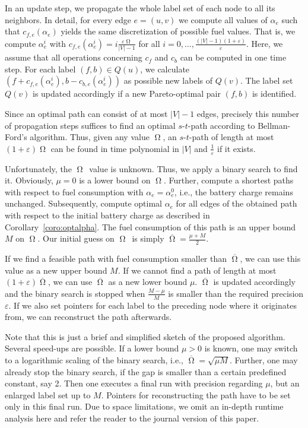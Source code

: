 \documentclass[a4paper]{scrartcl}
\newcommand{\OPT}{\ensuremath{\operatorname{\Omega}}}
\newcommand{\UB}{\ensuremath{M}}
\newcommand{\LB}{\ensuremath{\mu}}
\begin{document}
In an update step, we propagate the whole label set of each node to all its neighbors. In detail, for every edge $e=(u,v)$ we compute all values of $\alpha_e$ such that $c_{f,e}(\alpha_e)$ yields the same discretization of possible fuel values. That is, we compute $\alpha_e^i$ with $c_{f,e}(\alpha_e^i)=i\frac{\varepsilon \OPT}{|V|-1}$ for all $i=0,\dots,\frac{(|V|-1)(1+\varepsilon)}{\varepsilon}$. Here, we assume that all operations concerning $c_f$ and $c_b$ can be computed in one time step. For each label $(f,b)\in Q(u)$, we calculate $(f+c_{f,e}(\alpha_e^i),b-c_{b,e}(\alpha_e^i))$ as possible new labels of $Q(v)$. The label set $Q(v)$ is updated accordingly if a new Pareto-optimal pair $(f,b)$ is identified. 

Since an optimal path can consist of at most $|V|-1$ edges, precisely  this number of propagation steps suffices to find an optimal $s$-$t$-path according to Bellman-Ford's algorithm. Thus, given any value $\OPT$, an $s$-$t$-path of length at most $(1+\varepsilon)\OPT$ can be found in time polynomial in $|V|$ and $\frac{1}{\varepsilon}$ if it exists.

Unfortunately, the \OPT\ value is unknown. Thus, we apply a binary search to find it. Obviously, $\LB=0$ is a lower bound on \OPT. Further, compute a shortest paths with respect to fuel consumption with $\alpha_e=\alpha_e^0$, i.e., the battery charge remains unchanged. Subsequently, compute optimal $\alpha_e$ for all edges of the obtained path with respect to the initial battery charge as described in Corollary~\ref{coro:optalpha}. The fuel consumption of this path is an upper bound $\UB$ on \OPT. Our initial guess on \OPT\ is simply $\overline{\OPT}=\frac{\LB+\UB}{2}$. 

If we find a feasible path with fuel consumption smaller than $\overline{\OPT}$, we can use this value as a new upper bound \UB. If we cannot find a path of length at most $(1+\varepsilon)\overline{\OPT}$, we can use $\overline{\OPT}$ as a new lower bound \LB. $\overline{\OPT}$ is updated accordingly and the binary search is stopped when $\frac{\UB-\LB}{\UB}$ is smaller than the required precision $\varepsilon$. If we also set pointers for each label to the preceding node where it originates from, we can reconstruct the path afterwards.

Note that this is just a brief and simplified sketch of the proposed algorithm. Several speed-ups are possible. If a lower bound $\LB>0$ is known, one may switch to a logarithmic scaling of the binary search, i.e., $\overline{\OPT}=\sqrt{\LB\UB}$. Further, one may already stop the binary search, if the gap is smaller than a certain predefined constant, say 2. Then one executes a final run with precision regarding $\LB$, but an enlarged label set up to $\UB$. Pointers for reconstructing the path have to be set only in this final run. Due to space limitations, we omit an in-depth runtime analysis here and refer the reader to the journal version of this paper.
\end{document}
